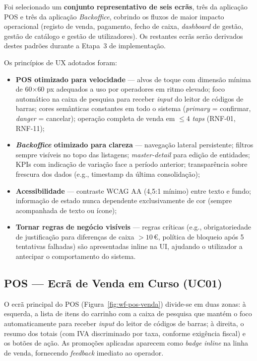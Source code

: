     Foi selecionado um \textbf{conjunto representativo de seis ecrãs}, três da aplicação POS e três da aplicação \textit{Backoffice}, cobrindo os fluxos de maior impacto operacional (registo de venda, pagamento, fecho de caixa, \textit{dashboard} de gestão, gestão de catálogo e gestão de utilizadores). Os restantes ecrãs serão derivados destes padrões durante a Etapa~3 de implementação.

    Os princípios de UX adotados foram:

    \begin{itemize}
        \item \textbf{POS otimizado para velocidade} --- alvos de toque com dimensão mínima de 60$\times$60 px adequados a uso por operadores em ritmo elevado; foco automático na caixa de pesquisa para receber \textit{input} do leitor de códigos de barras; cores semânticas constantes em todo o sistema (\textit{primary} = confirmar, \textit{danger} = cancelar); operação completa de venda em $\leq 4$ \textit{taps} (RNF-01, RNF-11);
        \item \textbf{\textit{Backoffice} otimizado para clareza} --- navegação lateral persistente; filtros sempre visíveis no topo das listagens; \textit{master-detail} para edição de entidades; KPIs com indicação de variação face a período anterior; transparência sobre frescura dos dados (e.g., timestamp da última consolidação);
        \item \textbf{Acessibilidade} --- contraste WCAG AA (4{,}5:1 mínimo) entre texto e fundo; informação de estado nunca dependente exclusivamente de cor (sempre acompanhada de texto ou ícone);
        \item \textbf{Tornar regras de negócio visíveis} --- regras críticas (e.g., obrigatoriedade de justificação para diferenças de caixa $> 10$\,€, política de bloqueio após 5 tentativas falhadas) são apresentadas inline na UI, ajudando o utilizador a antecipar o comportamento do sistema.
    \end{itemize}

\subsection{POS --- Ecrã de Venda em Curso (UC01)}

    O ecrã principal do POS (Figura~\ref{fig:wf-pos-venda}) divide-se em duas zonas: à esquerda, a lista de itens do carrinho com a caixa de pesquisa que mantém o foco automaticamente para receber \textit{input} do leitor de códigos de barras; à direita, o resumo dos totais (com IVA discriminado por taxa, conforme exigência fiscal) e os botões de ação. As promoções aplicadas aparecem como \textit{badge} \textit{inline} na linha de venda, fornecendo \textit{feedback} imediato ao operador.

